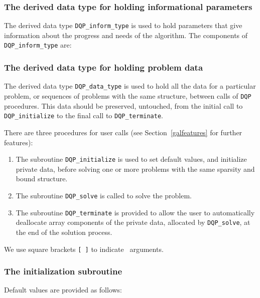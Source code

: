 \documentclass{galahad}
\newcommand{\packagename}{DQP}
\begin{document}

\subsubsection{The derived data type for holding informational
 parameters}\label{typeinform}
The derived data type
{\tt \packagename\_inform\_type}
is used to hold parameters that give information about the progress and needs
of the algorithm. The components of
{\tt \packagename\_inform\_type}
are:




\subsubsection{The derived data type for holding problem data}\label{typedata}
The derived data type
{\tt \packagename\_data\_type}
is used to hold all the data for a particular problem,
or sequences of problems with the same structure, between calls of
{\tt \packagename} procedures.
This data should be preserved, untouched, from the initial call to
{\tt \packagename\_initialize}
to the final call to
{\tt \packagename\_terminate}.


\galarguments
There are three procedures for user calls
(see Section~\ref{galfeatures} for further features):

\begin{enumerate}
\item The subroutine
      {\tt \packagename\_initialize}
      is used to set default values, and initialize private data,
      before solving one or more problems with the
      same sparsity and bound structure.
\item The subroutine
      {\tt \packagename\_solve}
      is called to solve the problem.
\item The subroutine
      {\tt \packagename\_terminate}
      is provided to allow the user to automatically deallocate array
       components of the private data, allocated by
       {\tt \packagename\_solve},
       at the end of the solution process.
\end{enumerate}
We use square brackets {\tt [ ]} to indicate \optional\ arguments.


\subsubsection{The initialization subroutine}\label{subinit}
 Default values are provided as follows:
\vspace*{1mm}
\end{document}
